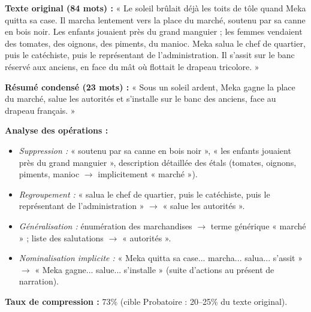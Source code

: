 \documentclass[11pt]{article}
\begin{document}
\begin{exoresolu}
\textbf{Texte original (84 mots) :}
« Le soleil brûlait déjà les toits de tôle quand Meka quitta sa case. Il marcha lentement vers la place du marché, soutenu par sa canne en bois noir. Les enfants jouaient près du grand manguier ; les femmes vendaient des tomates, des oignons, des piments, du manioc. Meka salua le chef de quartier, puis le catéchiste, puis le représentant de l'administration. Il s'assit sur le banc réservé aux anciens, en face du mât où flottait le drapeau tricolore. »

\textbf{Résumé condensé (23 mots) :}
« Sous un soleil ardent, Meka gagne la place du marché, salue les autorités et s'installe sur le banc des anciens, face au drapeau français. »

\textbf{Analyse des opérations :}
\begin{itemize}
    \item \emph{Suppression :} « soutenu par sa canne en bois noir », « les enfants jouaient près du grand manguier », description détaillée des étals (tomates, oignons, piments, manioc $\to$ implicitement « marché »).
    \item \emph{Regroupement :} « salua le chef de quartier, puis le catéchiste, puis le représentant de l'administration » $\to$ « salue les autorités ».
    \item \emph{Généralisation :} énumération des marchandises $\to$ terme générique « marché » ; liste des salutations $\to$ « autorités ».
    \item \emph{Nominalisation implicite :} « Meka quitta sa case... marcha... salua... s'assit » $\to$ « Meka gagne... salue... s'installe » (suite d'actions au présent de narration).
\end{itemize}
\textbf{Taux de compression :} 73\% (cible Probatoire : 20--25\% du texte original).
\end{exoresolu}
\end{document}

